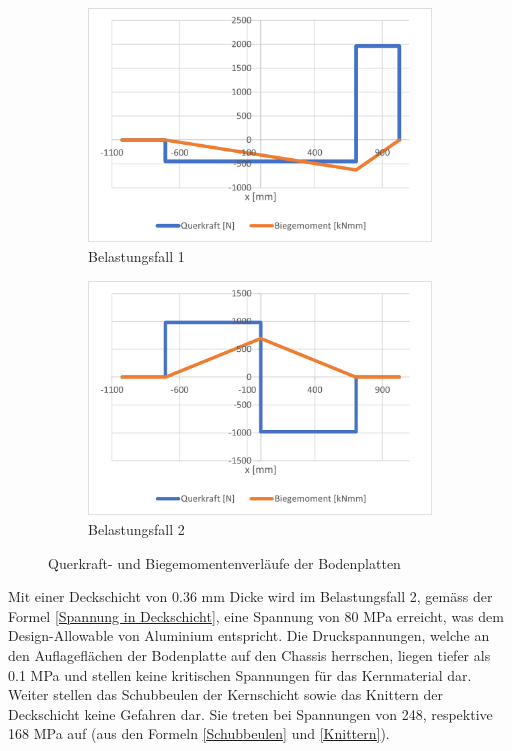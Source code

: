 \begin{figure}[H]
  \centering
    \begin{subfigure}{.5\textwidth}
      \centering
      \includegraphics[width=.98\linewidth]{04_figures/Boden QM1.png}
      \caption{Belastungsfall 1}
      \label{Boden QM1}
    \end{subfigure}%
    \begin{subfigure}{.5\textwidth}
      \centering
      \includegraphics[width=.98\linewidth]{04_figures/Boden QM2.png}
      \caption{Belastungsfall 2}
      \label{Boden QM2}
    \end{subfigure}%
  \caption{Querkraft- und Biegemomentenverläufe der Bodenplatten}
\label{Boden QM}
\end{figure}

Mit einer Deckschicht von 0.36 mm Dicke wird im Belastungsfall 2, gemäss der Formel \ref{Spannung in Deckschicht}, eine Spannung von 80 MPa erreicht, was dem Design-Allowable von Aluminium entspricht. Die Druckspannungen, welche an den Auflageflächen der Bodenplatte auf den Chassis herrschen, liegen tiefer als 0.1 MPa und stellen keine kritischen Spannungen für das Kernmaterial dar. Weiter stellen das Schubbeulen der Kernschicht sowie das Knittern der Deckschicht keine Gefahren dar. Sie treten bei Spannungen von 248, respektive 168 MPa auf (aus den Formeln \ref{Schubbeulen} und \ref{Knittern}).\\


